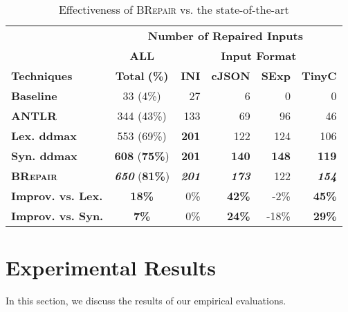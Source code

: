 \documentclass[sigconf,review,anonymous]{acmart}
\newcounter{todocounter}
\newcommand{\todo}[1]{\marginpar{$|$}\textcolor{red}{\stepcounter{todocounter}\footnote[\thetodocounter]{\textcolor{red}{\textbf{TODO }}\textit{#1}}}}
\renewcommand{\todo}[1]{}
\newcommand{\approach}{\textsc{BRepair}\xspace}
\begin{document}
\begin{table}[!tbp]\centering
\caption{Effectiveness of \approach vs. the state-of-the-art}
\begin{tabular}{|l | c | r  r  r  r |}
\hline
&  \multicolumn{5}{c|}{\textbf{Number of Repaired Inputs}}  \\
&  \multicolumn{1}{c|}{\textbf{ALL}} & \multicolumn{4}{c|}{\textbf{Input Format}}  \\
\textbf{Techniques} & \textbf{Total} \textbf{(\%)} & \textbf{INI} & \textbf{cJSON} & \textbf{SExp} & \textbf{TinyC} \\
\hline
\textbf{Baseline}   & 33 (4\%) & 27	 & 6 &	0	& 0\\
\textbf{ANTLR} & 344 (43\%) & 133 & 69 & 96 &  46   \\
\textbf{Lex. ddmax} & 553 (69\%) & \textbf{201}  & 122  & 124 & 106    \\ 			
\textbf{Syn. ddmax} & \textbf{608} (\textbf{75\%}) & \textbf{201}  & \textbf{140}  & \textbf{148}  & \textbf{119}  \\ 	
\hline 
\textbf{\approach}  & \textit{ \textbf{650}} (\textbf{81\%}) & \textit{ \textbf{201}} & \textit{ \textbf{173}}  & 122  & \textit{ \textbf{154}} \\
\hline
\textbf{Improv. vs. Lex.} &  \textbf{18\%}  & 0\% & \textbf{42\%} & -2\% & \textbf{45\%} \\ 
\textbf{Improv. vs. Syn.} &  \textbf{7\%}  & 0\% & \textbf{24\%} & -18\% & \textbf{29\%} \\
\hline
\end{tabular}
\label{tab:effectiveness}
\end{table}

\section{Experimental Results}
\label{sec:results}

In this section, we 
discuss the %
results 
of our empirical evaluations. 

\end{document}
